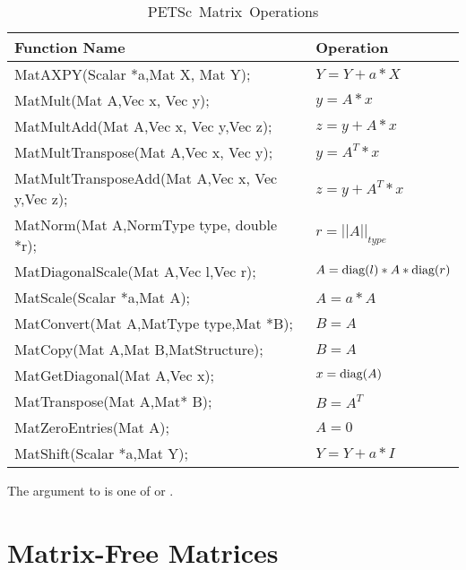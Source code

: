 \begin{table}[H]
\begin{center}
\begin{tabular}{ll}
{\bf Function Name} & {\bf Operation} \\
\hline
MatAXPY(Scalar *a,Mat X, Mat Y); & $ Y = Y + a*X $ \\
MatMult(Mat A,Vec x, Vec y); & $ y = A*x $ \\
MatMultAdd(Mat A,Vec x, Vec y,Vec z); & $ z = y + A*x $ \\
MatMultTranspose(Mat A,Vec x, Vec y); & $ y = A^{T}*x $ \\
MatMultTransposeAdd(Mat A,Vec x, Vec y,Vec z); & $ z = y + A^{T}*x $ \\
MatNorm(Mat A,NormType type,  double *r); & $ r = ||A||_{type}$ \\
MatDiagonalScale(Mat A,Vec l,Vec r); & $ A = \hbox{diag}(l)*A*\hbox{diag}(r) $ \\
MatScale(Scalar *a,Mat A); & $ A = a*A $ \\
MatConvert(Mat A,MatType type,Mat *B); & $ B = A $ \\
MatCopy(Mat A,Mat B,MatStructure); &  $ B = A $ \\
MatGetDiagonal(Mat A,Vec x); & $ x = \hbox{diag}(A)$ \\
MatTranspose(Mat A,Mat* B); & $ B = A^{T} $ \\
MatZeroEntries(Mat A); & $ A = 0 $ \\
MatShift(Scalar *a,Mat Y); & $ Y =  Y + a*I $ \\
\hline 
\end{tabular}
\end{center}
\caption{\hbox{PETSc Matrix Operations}}
\label{fig:matrixops}
\end{table}
The  argument to  is one of 
  or .
  
 

\section{Matrix-Free Matrices} 

